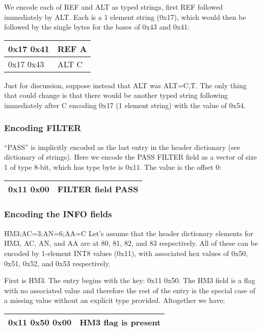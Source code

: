 \documentclass[8pt]{article}
\begin{document}
We encode each of REF and ALT as typed strings, first REF followed immediately
by ALT.  Each is a 1 element string (0x17), which would then be followed by the
single bytes for the bases of 0x43 and 0x41:

\vspace{0.3cm}
\begin{tabular}{|l| l|} \hline
0x17 0x41 & REF A \\ \hline
0x17 0x43 & ALT C \\ \hline
\end{tabular}

\vspace{0.3cm}
Just for discussion, suppose instead that ALT was ALT=C,T.  The only thing that could change is that there would be another typed string following immediately after C encoding 0x17 (1 element string) with the value of 0x54.

\subsubsection{Encoding FILTER}

``PASS'' is implicitly encoded as the last entry in the header dictionary (see dictionary of strings).  Here we encode the PASS FILTER field as a vector of size 1 of type 8-bit, which has type byte is 0x11.  The value is the offset 0:

\vspace{0.3cm}
\begin{tabular}{|l| l|} \hline
0x11 0x00 & FILTER field PASS \\ \hline
\end{tabular}

\subsubsection{Encoding the INFO fields}

HM3;AC=3;AN=6;AA=C
Let's assume that the header dictionary elements for HM3, AC, AN, and AA are at 80, 81, 82, and 83 respectively.  All of these can be encoded by 1-element INT8 values (0x11), with associated hex values of 0x50, 0x51, 0x52, and 0x53 respectively.

First is HM3.  The entry begins with the key: 0x11 0x50.
The HM3 field is a flag with no associated value and therefore the rest of the entry is the special case of a missing value without an explicit type provided.
Altogether we have:

\vspace{0.3cm}
\begin{tabular}{|l| l|} \hline
0x11 0x50 0x00 & HM3 flag is present \\ \hline
\end{tabular}
\vspace{0.3cm}
\end{document}
